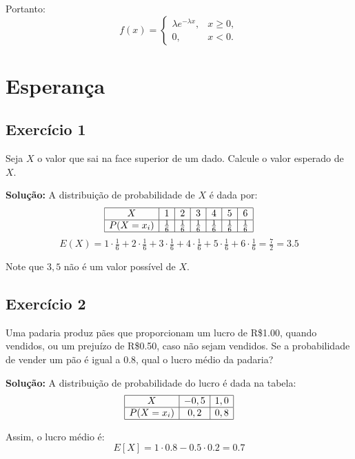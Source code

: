 \documentclass{article}
\begin{document}
Portanto:
    $$
    f(x) =
    \begin{cases}
    \lambda e^{-\lambda x}, & x \geq 0, \\
    0, & x < 0.
    \end{cases}
    $$

\section{Esperança}
\subsection{Exercício 1}
Seja $X$ o valor que sai na face superior de um dado.  
Calcule o valor esperado de $X$.  

\vspace{0.5cm}
\textbf{Solução:}
A distribuição de probabilidade de $X$ é dada por:
    $$
    \begin{array}{|c|c|c|c|c|c|c|}
    \hline
    X & 1 & 2 & 3 & 4 & 5 & 6 \\
    \hline
    P(X = x_i) & \tfrac{1}{6} & \tfrac{1}{6} & \tfrac{1}{6} & \tfrac{1}{6} & \tfrac{1}{6} & \tfrac{1}{6} \\
    \hline
    \end{array}
    $$
    $$
    E(X) = 1 \cdot \tfrac{1}{6} + 2 \cdot \tfrac{1}{6} + 3 \cdot \tfrac{1}{6} + 4 \cdot \tfrac{1}{6} + 5 \cdot \tfrac{1}{6} + 6 \cdot \tfrac{1}{6} = \tfrac{7}{2} = 3.5
    $$

Note que $3,5$ não é um valor possível de $X$.

\subsection{Exercício 2}
Uma padaria produz pães que proporcionam um lucro de R\$1.00, quando vendidos, ou um prejuízo de R\$0.50, caso não sejam vendidos.  
Se a probabilidade de vender um pão é igual a $0.8$, qual o lucro médio da padaria?

\vspace{0.5cm}
\textbf{Solução:}
A distribuição de probabilidade do lucro é dada na tabela:
    $$
    \begin{array}{|c|c|c|}
    \hline
    X & -0,5 & 1,0 \\
    \hline
    P(X = x_i) & 0,2 & 0,8 \\
    \hline
    \end{array}
    $$

Assim, o lucro médio é:
    $$
    E[X] = 1 \cdot 0.8 - 0.5 \cdot 0.2 = 0.7
    $$
\end{document}
